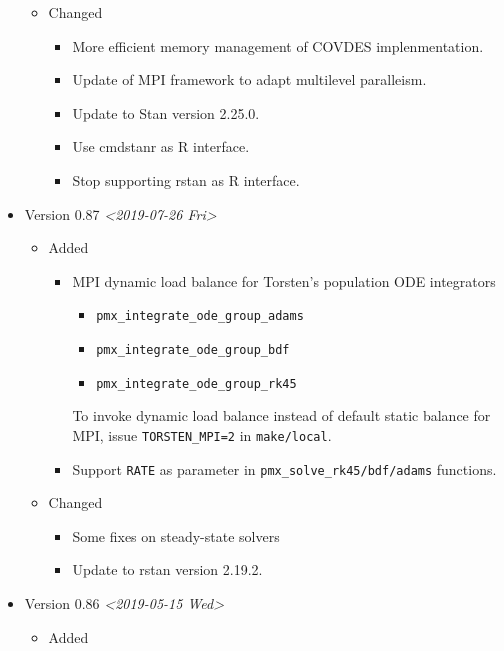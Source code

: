 \documentclass[12pt, reqno, oneside]{amsbook}
\numberwithin{equation}{chapter}
\numberwithin{figure}{chapter}
\numberwithin{table}{chapter}
\theoremstyle{remark}
\begin{document}
\begin{itemize}
\begin{itemize}
\item Changed
\begin{itemize}
\item More efficient memory management of COVDES implenmentation.
\item Update of MPI framework to adapt multilevel paralleism.
\item Update to Stan version 2.25.0.
\item Use cmdstanr as R interface.
\item Stop supporting rstan as R interface.
\end{itemize}
\end{itemize}
\item Version 0.87 \textit{<2019-07-26 Fri>}
\begin{itemize}
\item Added
\begin{itemize}
\item MPI dynamic load balance for Torsten's population ODE integrators
\begin{itemize}
\item \texttt{pmx_integrate_ode_group_adams}
\item \texttt{pmx_integrate_ode_group_bdf}
\item \texttt{pmx_integrate_ode_group_rk45}
\end{itemize}
To invoke dynamic load balance instead of default static
balance for MPI, issue \texttt{TORSTEN\_MPI=2} in \texttt{make/local}.
\item Support \texttt{RATE} as parameter in \texttt{pmx_solve_rk45/bdf/adams}
functions.
\end{itemize}
\item Changed
\begin{itemize}
\item Some fixes on steady-state solvers
\item Update to rstan version 2.19.2.
\end{itemize}
\end{itemize}
\item Version 0.86 \textit{<2019-05-15 Wed>}
\begin{itemize}
\item Added
\begin{itemize}

\end{itemize}
\end{itemize}
\end{itemize}
\end{document}
